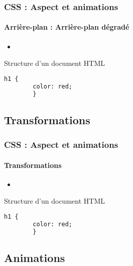 \documentclass[xcolor=table]{beamer}
\begin{document}
\begin{frame}[fragile]
\frametitle{CSS : Aspect et animations}
\framesubtitle{Arrière-plan : Arrière-plan dégradé}

\begin{minipage}{0.60\textwidth}
	\begin{itemize}
		\item 
	\end{itemize}
\end{minipage}
%
\begin{minipage}{0.38\textwidth}
	\begin{block}{Structure d'un document HTML}
		\lstset{escapeinside=**}
		\scriptsize\bfseries
		\begin{lstlisting}[language={html}]
		h1 {
		color: red;
		}
		\end{lstlisting}
	\end{block}
\end{minipage}
\end{frame}

\subsection{Transformations}

\begin{frame}[fragile]
\frametitle{CSS : Aspect et animations}
\framesubtitle{Transformations}

\begin{minipage}{0.60\textwidth}
	\begin{itemize}
		\item 
	\end{itemize}
\end{minipage}
%
\begin{minipage}{0.38\textwidth}
	\begin{block}{Structure d'un document HTML}
		\lstset{escapeinside=**}
		\scriptsize\bfseries
		\begin{lstlisting}[language={html}]
		h1 {
		color: red;
		}
		\end{lstlisting}
	\end{block}
\end{minipage}
\end{frame}

\subsection{Animations}
\end{document}
